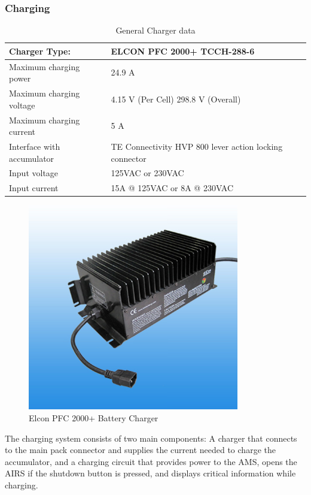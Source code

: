 \documentclass{article}
\begin{document}
\subsubsection{Charging}\label{accumulator_charging}

	\begin{table}[H]
	    \centering
	    \begin{tabular}{|l|l|}
	        \hline
	        Charger Type: & ELCON PFC 2000+ TCCH-288-6  \\ \hline
	        Maximum charging power & 24.9 A \\ \hline
	        Maximum charging voltage & 4.15 V (Per Cell) 298.8 V (Overall) \\ \hline
	        Maximum charging current & 5 A \\ \hline
	        Interface with accumulator & TE Connectivity HVP 800 lever action locking connector \\ \hline
	        Input voltage & 125VAC or 230VAC \\ \hline
	        Input current & 15A @ 125VAC or 8A @ 230VAC  \\ \hline
	    \end{tabular}
	    \caption{General Charger data}
	    \label{charger}
	\end{table}


 	\begin{figure}[H]
		\centering
		\includegraphics[width = 0.4 \textwidth]{Battery_Charger.jpg}
		\caption{Elcon PFC 2000+ Battery Charger}
		\label{Elcon Battery Charger}
	\end{figure}

	The charging system consists of two main components:  A charger that connects to the main pack connector and supplies the current needed to charge the accumulator, and a charging circuit that provides power to the AMS, opens the AIRS if the shutdown button is pressed, and displays critical information while charging. 
	
\end{document}

